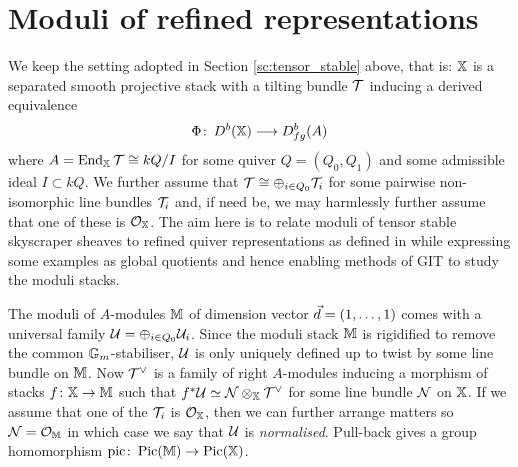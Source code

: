 \documentclass[12pt]{amsart}
\begin{document}
\section{Moduli of refined representations}  \label{sec:refined}

We keep the setting adopted in Section \ref{sc:tensor_stable} above, that is: $\mathbb{X}$ is a separated smooth projective stack with a tilting bundle $\mathcal{T}$ inducing a derived equivalence $$\Phi \colon \, D^b(\mathbb{X}) \longrightarrow D^b_{fg}(A)$$ where $A=\operatorname{End}_{\mathbb{X}} \mathcal{T} \cong kQ/I$ for some quiver $Q = (Q_0,Q_1)$ and some admissible ideal $I\subset kQ$. We further assume that $\mathcal{T} \cong \oplus_{i\in Q_0} \mathcal{T}_i$ for some pairwise non-isomorphic line bundles $\mathcal{T}_i$ and, if need be, we may harmlessly further assume that one of these is $\mathcal{O}_{\mathbb{X}}$. The aim here is to relate moduli of tensor stable skyscraper sheaves to refined quiver representations as defined in \cite{AU} while expressing some examples as global quotients and hence enabling methods of GIT to study the moduli stacks. 

The moduli of $A$-modules $\mathbb{M}$ of dimension vector ${\vec{d}} = (1, \ldots, 1)$ comes with a universal family $\mathcal{U}  = \oplus_{i \in Q_0} \mathcal{U}_i$. Since the moduli stack $\mathbb{M}$ is rigidified to remove the common $\mathbb{G}_m$-stabiliser, $\mathcal{U}$ is only uniquely defined up to twist by some line bundle on $\mathbb{M}$. 
Now $\mathcal{T}^{\vee}$ is a family of right $A$-modules inducing a morphism of stacks $f \colon \mathbb{X} \rightarrow \mathbb{M}$ such that $f^* \mathcal{U} \simeq \mathcal{N} \otimes_{\mathbb{X}} \mathcal{T}^{\vee}$ for some line bundle $\mathcal{N}$ on $\mathbb{X}$. If we assume that one of the $\mathcal{T}_i$ is $\mathcal{O}_{\mathbb{X}}$, then we can further arrange matters so $\mathcal{N} = \mathcal{O}_{\mathbb{M}}$ in which case we say that $\mathcal{U}$ is {\em normalised}. Pull-back gives a group homomorphism $\text{pic} \colon \operatorname{Pic}(\mathbb{M}) \rightarrow \operatorname{Pic}(\mathbb{X})$. 


\end{document}
